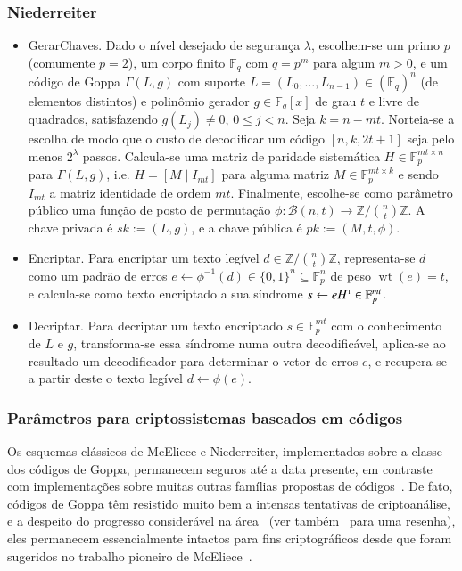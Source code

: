 \documentclass{SBCbookchapter}
\newcommand{\F}{\mathbb{F}}
\newcommand{\Z}{\mathbb{Z}}
\newcommand{\tp}{\textrm{\tiny T}}
\DeclareMathOperator{\wt}{wt}
\begin{document}
\begin{otherlanguage}{brazilian}
\subsubsection{Niederreiter}\label{subsubsec:niederreiter}

\begin{itemize}
\item \textsf{GerarChaves}. Dado o nível desejado de segurança $\lambda$, escolhem-se um primo $p$ (comumente $p = 2$), um corpo finito $\F_{q}$ com $q = p^m$ para algum $m > 0$, e um código de Goppa $\Gamma(L, g)$ com suporte $L = (L_0, \dots, L_{n-1}) \in (\F_{q})^n$ (de elementos distintos) e polinômio gerador $g \in \F_{q}[x]$ de grau $t$ e livre de quadrados, satisfazendo $g(L_j) \neq 0$, $0 \leqslant j < n$. Seja $k = n - mt$. Norteia-se a escolha de modo que o custo de decodificar um código $[n, k, 2t + 1]$ seja pelo menos $2^\lambda$ passos.
Calcula-se uma matriz de paridade sistemática $H \in \F_p^{mt \times n}$ para $\Gamma(L, g)$, i.e. $H = [M \mid I_{mt}]$ para alguma matriz $M \in \F_p^{mt \times k}$ e sendo $I_{mt}$ a matriz identidade de ordem $mt$. Finalmente, escolhe-se como parâmetro público uma função de posto de permutação $\phi: \mathcal{B}(n, t) \rightarrow \Z/\binom{n}{t}\Z$. A chave privada é $sk := (L, g)$, e a chave pública é $pk := (M, t, \phi)$.

\item \textsf{Encriptar}. Para encriptar um texto legível $d \in \Z/\binom{n}{t}\Z$, representa-se $d$ como um padrão de erros $e \gets \phi^{-1}(d) \in \{0, 1\}^n \subseteq \F_p^n$ de peso $\wt(e) = t$, e calcula-se como texto encriptado a sua síndrome $s \gets e H^{\tp} \in \F_p^{mt}$.

\item \textsf{Decriptar}. Para decriptar um texto encriptado $s \in \F_p^{mt}$ com o conhecimento de $L$ e $g$, transforma-se essa síndrome numa outra decodificável, aplica-se ao resultado um decodificador para determinar o vetor de erros $e$, e recupera-se a partir deste o texto legível $d \gets \phi(e)$.
\end{itemize}

\subsubsection{Parâmetros para criptossistemas baseados em códigos}\label{subsubsec:generic-crypto}

Os esquemas clássicos de McEliece e Niederreiter, implementados sobre a classe dos códigos de Goppa, permanecem seguros até a data presente, em contraste com implementações sobre muitas outras famílias propostas de códigos~\cite{gibson1996,otmani-tillich-dallot}. De fato, códigos de Goppa têm resistido muito bem a intensas tentativas de criptoanálise, e a despeito do progresso considerável na área~\cite{bernstein-lange-peters:bcd} (ver também~\cite{bernstein-buchmann-dahmen} para uma resenha), eles permanecem essencialmente intactos para fins criptográficos desde que foram sugeridos no trabalho pioneiro de McEliece~\cite{McEliece}.


\end{otherlanguage}
\end{document}
